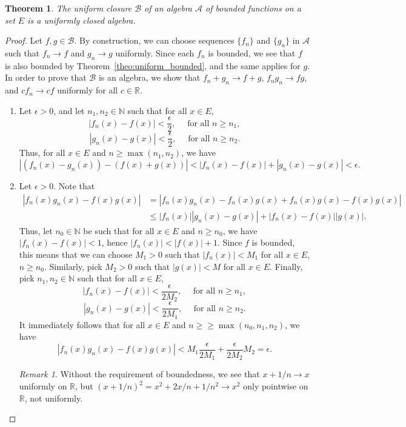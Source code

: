 \documentclass[11pt]{article}
\def\R{\mathbb{R}}
\def\N{\mathbb{N}}
\newtheorem{theorem}{Theorem}[section]
\theoremstyle{definition}
\theoremstyle{remark}
\newtheorem*{remark}{Remark}
\begin{document}
    \begin{theorem}
        The uniform closure $\mathscr{B}$ of an algebra $\mathscr{A}$ of bounded
        functions on a set $E$ is a uniformly closed algebra.
    \end{theorem}
    \begin{proof}
        Let $f, g \in \mathscr{B}$. By construction, we can choose sequences
        $\{f_n\}$ and $\{g_n\}$ in $\mathscr{A}$ such that $f_n \to f$ and $g_n \to
        g$ uniformly. Since each $f_n$ is bounded, we see that $f$ is also bounded by
        Theorem~\ref{theo:uniform_bounded}, and the same applies for $g$. In order to
        prove that $\mathscr{B}$ is an algebra, we show that $f_n + g_n \to f + g$,
        $f_ng_n \to fg$, and $cf_n \to cf$ uniformly for all $c \in \R$.
        \begin{enumerate}
            \item Let $\epsilon > 0$, and let $n_1, n_2 \in \N$ such that for all $x
            \in E$, \[
                |f_n(x) - f(x)| < \frac{\epsilon}{2}, \quad \text{ for all } n \geq n_1,
            \] \[
                |g_n(x) - g(x)| < \frac{\epsilon}{2}, \quad \text{ for all } n \geq n_2.
            \] Thus, for all $x \in E$ and $n \geq \max(n_1, n_2)$, we have \[
                |(f_n(x) - g_n(x)) - (f(x) + g(x))| < |f_n(x) - f(x)| + |g_n(x) -
                g(x)| < \epsilon.
            \] 

            \item Let $\epsilon > 0$. Note that \begin{align*}
                |f_n(x)g_n(x) - f(x)g(x)| &= |f_n(x)g_n(x) - f_n(x)g(x) + f_n(x)g(x)
                - f(x)g(x)| \\
                & \leq |f_n(x)| |g_n(x) - g(x)| + |f_n(x) - f(x)| |g(x)|.
            \end{align*}
            Thus, let $n_0 \in \N$ be such that for all $x \in E$ and $n \geq n_0$,
            we have $|f_n(x) - f(x)| < 1$, hence $|f_n(x)| < |f(x)| + 1$. Since $f$
            is bounded, this means that we can choose $M_1 > 0$ such that $|f_n(x)| <
            M_1$ for all $x \in E$, $n \geq n_0$. Similarly, pick $M_2 > 0$ such that
            $|g(x)| < M$ for all $x \in E$. Finally, pick $n_1, n_2 \in \N$ such that
            for all $x \in E$, \[
                |f_n(x) - f(x)| < \frac{\epsilon}{2M_2}, \quad \text{ for all } n
                \geq n_1,
            \] \[
                |g_n(x) - g(x)| < \frac{\epsilon}{2M_1}, \quad \text{ for all } n
                \geq n_2.
            \] It immediately follows that for all $x \in E$ and $n \geq \geq
            \max(n_0, n_1, n_2)$, we have \[
                |f_n(x)g_n(x) - f(x)g(x)| < M_1\frac{\epsilon}{2M_1} +
                \frac{\epsilon}{2M_2}M_2 = \epsilon.
            \] 
            \begin{remark}
                Without the requirement of boundedness, we see that $x + 1 / n \to x$
                uniformly on $\R$, but $(x + 1 / n)^2 = x^2 + 2x / n + 1 / n^2 \to
                x^2$ only pointwise on $\R$, not uniformly.
            \end{remark}


\end{enumerate}
\end{proof}
\end{document}
